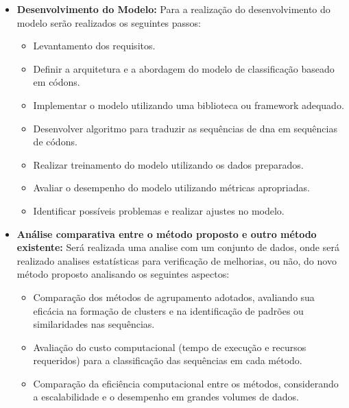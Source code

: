 \begin{itemize}
  \item \textbf{Desenvolvimento do Modelo:} Para a realização do desenvolvimento do modelo serão realizados os seguintes passos:
        \begin{itemize}
          \item Levantamento dos requisitos.
          \item Definir a arquitetura e a abordagem do modelo de classificação baseado em códons.
          \item Implementar o modelo utilizando uma biblioteca ou framework adequado.
          \item Desenvolver algoritmo para traduzir as sequências de \gls{dna} em sequências de códons.
          \item Realizar treinamento do modelo utilizando os dados preparados.
          \item Avaliar o desempenho do modelo utilizando métricas apropriadas.
          \item Identificar possíveis problemas e realizar ajustes no modelo.
        \end{itemize}

  \item \textbf{Análise comparativa entre o método proposto e outro método existente:} Será realizada uma analise com um conjunto de dados, onde será realizado analises estatísticas para verificação de melhorias, ou não, do novo método proposto analisando os seguintes aspectos:
        \begin{itemize}
          \item Comparação dos métodos de agrupamento adotados, avaliando sua eficácia na formação de clusters e na identificação de padrões ou similaridades nas sequências.
          \item Avaliação do custo computacional (tempo de execução e recursos requeridos) para a classificação das sequências em cada método.
          \item Comparação da eficiência computacional entre os métodos, considerando a escalabilidade e o desempenho em grandes volumes de dados.
        \end{itemize}
\end{itemize}

